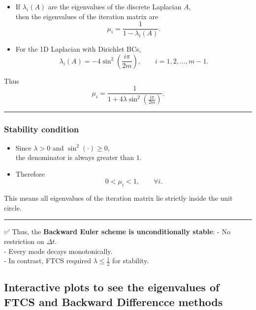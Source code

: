 \documentclass[
  letterpaper,
]{book}
\providecommand{\tightlist}{%
  \setlength{\itemsep}{0pt}\setlength{\parskip}{0pt}}
\begin{document}
\begin{tcolorbox}
\begin{itemize}
\item
  If \(\lambda_i(A)\) are the eigenvalues of the discrete Laplacian
  \(A\),\\
  then the eigenvalues of the iteration matrix are \[
  \mu_i = \frac{1}{1 - \lambda_i(A)}.
  \]
\item
  For the 1D Laplacian with Dirichlet BCs, \[
  \lambda_i(A) = -4 \sin^2\!\left(\frac{i\pi}{2m}\right), 
  \qquad i=1,2,\dots,m-1.
  \]
\end{itemize}

Thus \[
\mu_i = \frac{1}{1 + 4\lambda \sin^2\!\left(\frac{i\pi}{2m}\right)}.
\]

\begin{center}\rule{0.5\linewidth}{0.5pt}\end{center}

\subsubsection{Stability condition}\label{stability-condition-2}

\begin{itemize}
\tightlist
\item
  Since \(\lambda>0\) and \(\sin^2(\cdot)\ge0\),\\
  the denominator is always greater than \(1\).\\
\item
  Therefore \[
  0 < \mu_i < 1, \qquad \forall i.
  \]
\end{itemize}

This means all eigenvalues of the iteration matrix lie strictly inside
the unit circle.

\begin{center}\rule{0.5\linewidth}{0.5pt}\end{center}

✅ Thus, the \textbf{Backward Euler scheme is unconditionally stable}: -
No restriction on \(\Delta t\).\\
- Every mode decays monotonically.\\
- In contrast, FTCS required \(\lambda \le \tfrac{1}{2}\) for stability.

\end{tcolorbox}

\subsection{Interactive plots to see the eigenvalues of FTCS and
Backward Differencce
methods}\label{interactive-plots-to-see-the-eigenvalues-of-ftcs-and-backward-differencce-methods}
\end{document}
